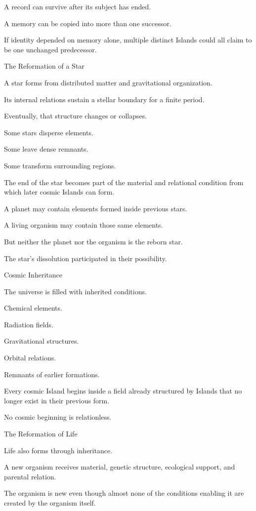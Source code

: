 A record can survive after its subject has ended.

A memory can be copied into more than one successor.

If identity depended on memory alone, multiple distinct Islands could all claim to be one unchanged predecessor.

The Reformation of a Star

A star forms from distributed matter and gravitational organization.

Its internal relations sustain a stellar boundary for a finite period.

Eventually, that structure changes or collapses.

Some stars disperse elements.

Some leave dense remnants.

Some transform surrounding regions.

The end of the star becomes part of the material and relational condition from which later cosmic Islands can form.

A planet may contain elements formed inside previous stars.

A living organism may contain those same elements.

But neither the planet nor the organism is the reborn star.

The star’s dissolution participated in their possibility.

Cosmic Inheritance

The universe is filled with inherited conditions.

Chemical elements.

Radiation fields.

Gravitational structures.

Orbital relations.

Remnants of earlier formations.

Every cosmic Island begins inside a field already structured by Islands that no longer exist in their previous form.

No cosmic beginning is relationless.

The Reformation of Life

Life also forms through inheritance.

A new organism receives material, genetic structure, ecological support, and parental relation.

The organism is new even though almost none of the conditions enabling it are created by the organism itself.

